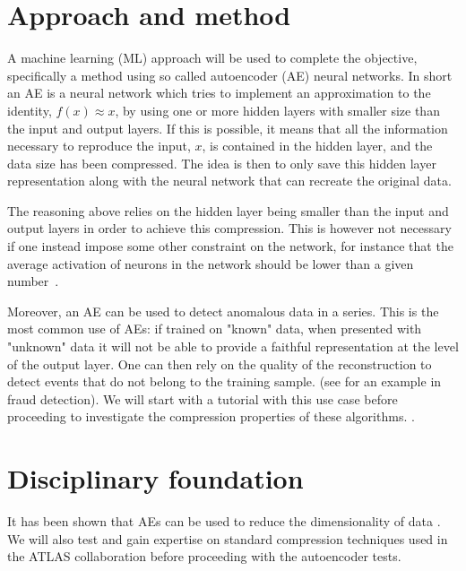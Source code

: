\documentclass[11pt]{article}
\begin{document}
\section{Approach and method}

A machine learning (ML) approach will be used to complete the objective, specifically a method using so called autoencoder (AE) neural networks. In short an AE is a neural network which tries to implement an approximation to the identity, $f(x) \approx x$, by using one or more hidden layers with smaller size than the input and output layers. If this is possible, it means that all the information necessary to reproduce the input, $x$, is contained in the hidden layer, and the data size has been compressed. The idea is then to only save this hidden layer representation along with the neural network that can recreate the original data. 

The reasoning above relies on the hidden layer being smaller than the input and output layers in order to achieve this compression. This is however not necessary if one instead impose some other constraint on the network, for instance that the average activation of neurons in the network should be lower than a given number~\cite{ng_autoenc}. %

Moreover, an AE can be used to detect anomalous data in a series. This is the most common use of AEs: if trained on "known" data, when presented with "unknown" data it will not be able to provide a faithful representation at the level of the output layer. One can then rely on the quality of the reconstruction to detect events that do not belong to the training sample. (see 
for an example in fraud detection). We will start with a tutorial with this use case before proceeding to investigate the compression properties of these algorithms. . 

\section{Disciplinary foundation}

It has been shown that AEs can be used to reduce the dimensionality of data \cite{hinton}. We will also test and gain expertise on standard compression techniques used in the ATLAS collaboration %
before proceeding with the autoencoder tests. 
\end{document}

